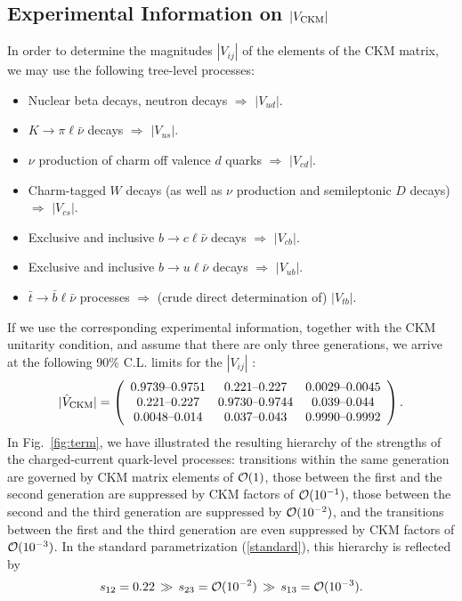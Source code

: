 \documentclass[12pt]{article}
\begin{document}
%
%
%
\boldmath\subsection{Experimental Information on $|V_{\rm CKM}|$}\unboldmath
%
%
%
In order to determine the magnitudes $|V_{ij}|$ of the elements of the
CKM matrix, we may use the following tree-level processes:
\begin{itemize}
\item Nuclear beta decays, neutron decays $\Rightarrow$ $|V_{ud}|$.
\item $K\to\pi\ell\bar\nu$ decays $\Rightarrow$ $|V_{us}|$.
\item $\nu$ production of charm off valence $d$ quarks
$\Rightarrow$ $|V_{cd}|$.
\item Charm-tagged $W$ decays (as well as $\nu$ production and 
semileptonic $D$ decays)  $\Rightarrow$ $|V_{cs}|$.
\item Exclusive and inclusive $b\to c \ell \bar\nu$ decays 
$\Rightarrow$ $|V_{cb}|$.
\item Exclusive and inclusive 
$b\to u \ell \bar \nu$ decays $\Rightarrow$ $|V_{ub}|$.
\item $\bar t\to \bar b \ell \bar\nu$ processes $\Rightarrow$ (crude direct 
determination of) $|V_{tb}|$.
\end{itemize}
If we use the corresponding experimental information, together with the 
CKM unitarity condition, and assume that there are only three generations, 
we arrive at the following 90\% C.L. limits for the $|V_{ij}|$ \cite{PDG}:
\begin{equation}\label{CKM-mag}
|\hat V_{\rm CKM}|=
\left(\begin{array}{ccc}
$0.9739\mbox{--}0.9751$ & $0.221\mbox{--}0.227$ & $0.0029\mbox{--}0.0045$\\ 
$0.221\mbox{--}0.227$ & $0.9730\mbox{--}0.9744$ & $0.039\mbox{--}0.044$\\ 
$0.0048\mbox{--}0.014$ & $0.037\mbox{--}0.043$ & $0.9990\mbox{--}0.9992$\\ 
\end{array}\right).
\end{equation}
In Fig.~\ref{fig:term}, we have illustrated the resulting hierarchy 
of the strengths of the charged-current quark-level processes:
transitions within the same generation are governed by 
CKM matrix elements of ${\cal O}(1)$, those between the first and the second 
generation are suppressed by CKM factors of ${\cal O}(10^{-1})$, those 
between the second and the third generation are suppressed by 
${\cal O}(10^{-2})$, and the transitions between the first and the third 
generation are even suppressed by CKM factors of ${\cal O}(10^{-3})$. 
In the standard parametrization (\ref{standard}), this hierarchy is 
reflected by 
\begin{equation}
s_{12}=0.22 \,\gg\, s_{23}={\cal O}(10^{-2}) \,\gg\, 
s_{13}={\cal O}(10^{-3}). 
\end{equation}
\end{document}
